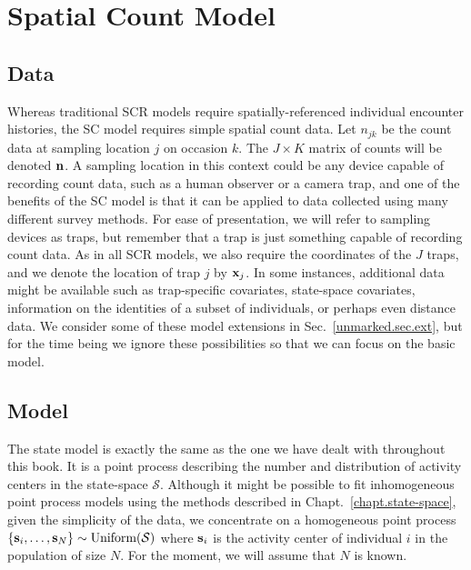 \section{Spatial Count Model}

\subsection{Data}

Whereas traditional SCR models require spatially-referenced
individual encounter histories, the SC model requires simple spatial count data.
Let $n_{jk}$ be the count data at sampling location $j$ %
on occasion $k$. %
The $J \times K$ matrix of
counts will be denoted $\bf{n}$. A sampling location in this context
could be any device capable of recording count data, such as a
human observer or a camera trap, and
one of the benefits of the SC model is that it
can be applied to data collected using many different survey
methods. For ease of presentation, we will refer to sampling devices
as traps, but remember that a trap is just something capable of
recording count data. As in all SCR models, we also require the
coordinates of the $J$ traps, and we denote the location of trap $j$
by ${\bf x}_j$. In some instances, additional data might be available such as
trap-specific covariates, state-space covariates,
information on the identities of a subset of individuals, or perhaps
even distance data. We consider some of these model extensions in
Sec.~\ref{unmarked.sec.ext}, but for the time being we ignore these %
possibilities so that we can focus on the basic model.


\subsection{Model}

The state model is exactly the same as the one we have dealt with
throughout
this book. It is a point process describing the number and distribution of
activity centers in the state-space $\mathcal{S}$. Although it might
be possible to fit inhomogeneous point process models using the
methods described in Chapt.~\ref{chapt.state-space},
given the simplicity of the data, we concentrate on a homogeneous point process
$\{{\bf s}_i, \ldots, {\bf s}_N\} \sim \text{Uniform}(\mathcal{S})$
where ${\bf s}_i$ is the activity center of individual $i$ in the
population of size $N$. For the moment, we will assume that $N$ is
known.

